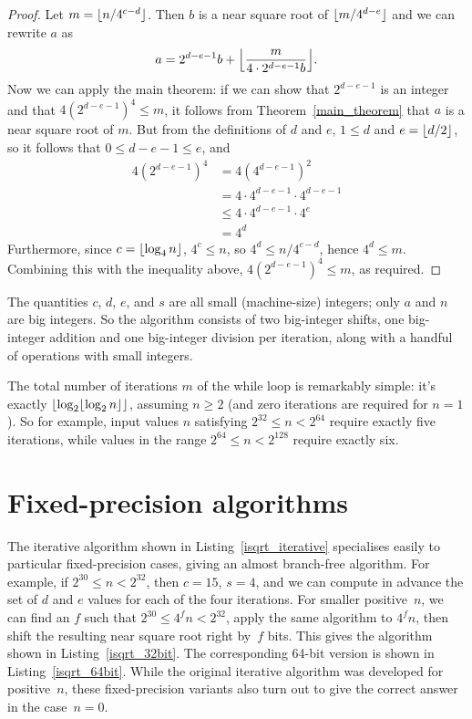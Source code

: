 \documentclass[a4paper]{article}
\DeclarePairedDelimiter\floor{\lfloor}{\rfloor}
\theoremstyle{plain}
\theoremstyle{definition}
\begin{document}
\begin{proof}
  Let $m = \floor{n / 4^{c-d}}$. Then $b$ is a near square root of
  $\floor{m/4^{d-e}}$ and we can rewrite $a$ as
  $$a = 2^{d-e-1}b + \floor*{\frac{m}{4\cdot 2^{d-e-1}b}}.$$ Now we can apply
  the main theorem: if we can show that $2^{d-e-1}$ is an integer and that
  $4(2^{d-e-1})^4 \le m$, it follows from Theorem~\ref{main_theorem} that $a$
  is a near square root of $m$. But from the definitions of $d$ and $e$, $1 \le
  d$ and $e = \floor{d/2}$, so it follows that $0 \le d - e - 1 \le e$, and
  \begin{align*}
    4(2^{d-e-1})^4 &= 4(4^{d-e-1})^2 \\
                  &= 4\cdot 4^{d-e-1}\cdot 4^{d-e-1} \\
                  &\le 4\cdot 4^{d-e-1}\cdot 4^e \\
                  &= 4^d
  \end{align*}
  Furthermore, since $c = \floor{\log_4 n}$, $4^c \le n$, so $4^d \le n /
  4^{c-d}$, hence $4^d \le m$. Combining this with the inequality above,
  $4(2^{d-e-1})^4 \le m$, as required.
\end{proof}

The quantities $c$, $d$, $e$, and $s$ are all small (machine-size) integers;
only $a$ and $n$ are big integers. So the algorithm consists of two big-integer
shifts, one big-integer addition and one big-integer division per iteration,
along with a handful of operations with small integers.

The total number of iterations $m$ of the while loop is remarkably simple: it's
exactly $\floor*{\log_2 \floor{\log_2 n}}$, assuming $n\ge 2$ (and zero
iterations are required for $n = 1$). So for example, input values $n$
satisfying $2^{32} \le n < 2^{64}$ require exactly five iterations, while
values in the range $2^{64} \le n < 2^{128}$ require exactly six.

\section{Fixed-precision algorithms}

The iterative algorithm shown in Listing~\ref{isqrt_iterative} specialises
easily to particular fixed-precision cases, giving an almost branch-free
algorithm. For example, if $2^{30} \le n < 2^{32}$, then $c = 15$, $s=4$, and
we can compute in advance the set of $d$ and $e$ values for each of the four
iterations. For smaller positive~$n$, we can find an $f$ such that $2^{30} \le
4^f n < 2^{32}$, apply the same algorithm to $4^f n$, then shift the resulting
near square root right by~$f$ bits. This gives the algorithm shown in
Listing~\ref{isqrt_32bit}. The corresponding 64-bit version is shown in
Listing~\ref{isqrt_64bit}. While the original iterative algorithm was developed for
positive~$n$, these fixed-precision variants also turn out to give the correct
answer in the case~$n = 0$.
\end{document}
